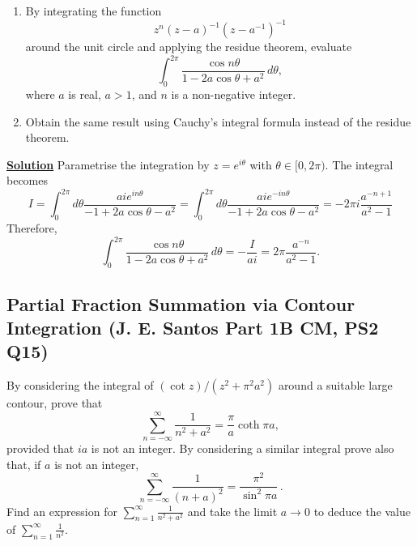 \begin{enumerate}
  \item By integrating the function
  \[
    z^n (z - a)^{-1} (z - a^{-1})^{-1}
  \]
  around the unit circle and applying the residue theorem, evaluate
  \begin{equation}
    \int_{0}^{2\pi} \frac{\cos n\theta}{1 - 2a\cos\theta + a^2}\, d\theta,
  \end{equation}
  where $a$ is real, $a > 1$, and $n$ is a non-negative integer.

  \item Obtain the same result using Cauchy’s integral formula instead of the residue theorem.

\end{enumerate}

\noindent \underline{\textbf{Solution}} Parametrise the integration by $z=e^{i\theta}$ with $\theta\in[0,2\pi)$. The integral becomes
\begin{equation}
    I = \int^{2\pi}_0d\theta\frac{aie^{in\theta}}{-1+2a\cos\theta-a^2}  =\int^{2\pi}_0d\theta\frac{aie^{-in\theta}}{-1+2a\cos\theta-a^2} = -2\pi i\frac{a^{-n+1}}{a^2-1}
\end{equation}
Therefore, 
\begin{equation}
    \int_{0}^{2\pi} \frac{\cos n\theta}{1 - 2a\cos\theta + a^2}\, d\theta = -\frac{I}{ai} = 2\pi\frac{a^{-n}}{a^2-1}.
  \end{equation}



  \subsection{Partial Fraction Summation via Contour Integration (J. E. Santos Part 1B CM, PS2 Q15)}
\label{sec:partial-fraction-sums}

By considering the integral of $(\cot z)/(z^2+\pi^2 a^2)$
around a suitable large contour, prove that
\begin{equation}
  \sum_{n=-\infty}^{\infty}\frac{1}{n^2+a^2} = \frac{\pi}{a}\coth\pi a,
\end{equation}
provided that $ia$ is not an integer. By considering a similar integral prove
also that, if $a$ is not an integer,
\begin{equation}
  \sum_{n=-\infty}^{\infty}\frac{1}{(n+a)^2} = \frac{\pi^2}{\sin^2\pi a}\,.
\end{equation}
Find an expression for $\displaystyle\sum_{n=1}^{\infty}\frac{1}{n^2+a^2}$
and take the limit $a\to 0$ to deduce the value of
$\displaystyle\sum_{n=1}^{\infty}\frac{1}{n^2}$.

